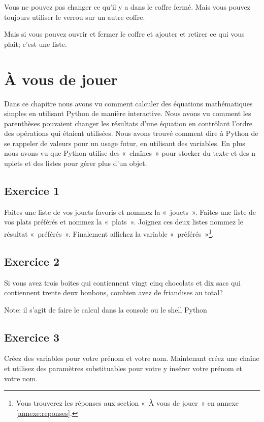 Vous ne pouvez pas changer ce qu'il y a dans le coffre fermé. Mais vous pouvez toujours utiliser le verrou  sur un autre coffre.

Mais si vous pouvez ouvrir et fermer le coffre et ajouter et retirer ce qui vous plait; c'est une liste.

\section{À vous de jouer\label{pratique:8}}

Dans ce chapitre nous avons vu comment calculer des équations mathématiques simples en utilisant Python de manière interactive. Nous avons vu comment les parenthèses pouvaient changer les résultats d'une équation en contrôlant l'ordre des opérations qui étaient utilisées. Nous avons trouvé comment dire à Python de se rappeler de valeurs pour un usage futur, en utilisant des variables. En plus nous avons vu que Python utilise des «~chaînes~» pour stocker du texte et des n-uplets et des listes pour gérer plus d'un objet.

\subsection{Exercice 1}
Faites une liste de vos jouets favoris et nommez la «~jouets~». Faites une liste de vos plats préférés et nommez la «~plats~». Joignez ces deux listes nommez le résultat «~préférés~». Finalement affichez la variable «~préférés~»\footnote{Vous trouverez les réponses aux section «~À vous de jouer~» en annexe \ref{annexe:reponses}.}.

\subsection{Exercice 2}
Si vous avez trois boites qui contiennent vingt cinq chocolats et dix sacs qui contiennent trente deux bonbons, combien avez de friandises au total? 

Note: il s'agit de faire le calcul dans la console ou le shell Python

\subsection{Exercice 3}
Créez des variables pour votre prénom et votre nom. Maintenant créez une chaîne et utilisez des paramètres substituables pour votre y insérer votre prénom et votre nom.\\


